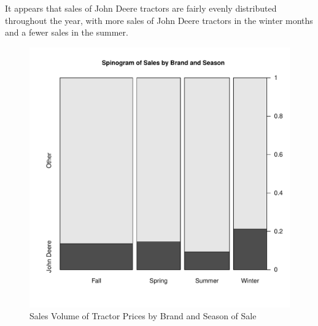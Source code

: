 \documentclass[11pt]{book}
\begin{document}
It appears that sales of John Deere tractors are fairly evenly
distributed throughout the year, 
with more sales of John Deere tractors in the winter months
and a fewer sales in the summer. 


\begin{figure}[h!]
  \centering
  \includegraphics[scale = 0.5, keepaspectratio=true]{../Figures/brand_and_season_sales}
  \caption{Sales Volume of Tractor Prices by Brand and Season of Sale} \label{fig:brand_and_season_sales}
\end{figure}



\end{document}
